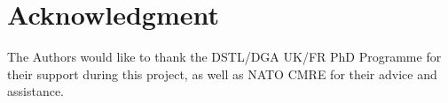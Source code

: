 \documentclass[conference]{IEEEtran}
\begin{document}
\section*{Acknowledgment}

 The Authors would like to thank the DSTL/DGA UK/FR PhD Programme for their support during this project, as well as NATO CMRE for their advice and assistance.






%
%
%




\end{document}
